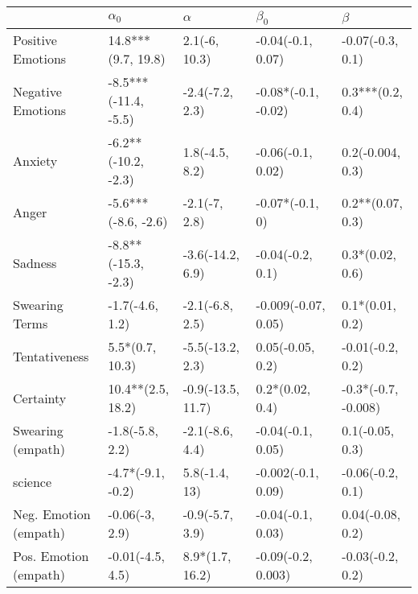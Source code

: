 \begin{tabular}{lllll}
\toprule
{} &            $\alpha_0$ &           $\alpha$ &            $\beta_0$ &              $\beta$ \\
\midrule
Positive Emotions     &    14.8***(9.7, 19.8) &      2.1(-6, 10.3) &    -0.04(-0.1, 0.07) &     -0.07(-0.3, 0.1) \\
Negative Emotions     &  -8.5***(-11.4, -5.5) &    -2.4(-7.2, 2.3) &  -0.08*(-0.1, -0.02) &     0.3***(0.2, 0.4) \\
Anxiety               &   -6.2**(-10.2, -2.3) &     1.8(-4.5, 8.2) &    -0.06(-0.1, 0.02) &     0.2(-0.004, 0.3) \\
Anger                 &   -5.6***(-8.6, -2.6) &      -2.1(-7, 2.8) &      -0.07*(-0.1, 0) &     0.2**(0.07, 0.3) \\
Sadness               &   -8.8**(-15.3, -2.3) &   -3.6(-14.2, 6.9) &     -0.04(-0.2, 0.1) &      0.3*(0.02, 0.6) \\
Swearing Terms        &       -1.7(-4.6, 1.2) &    -2.1(-6.8, 2.5) &  -0.009(-0.07, 0.05) &      0.1*(0.01, 0.2) \\
Tentativeness         &       5.5*(0.7, 10.3) &   -5.5(-13.2, 2.3) &     0.05(-0.05, 0.2) &     -0.01(-0.2, 0.2) \\
Certainty             &     10.4**(2.5, 18.2) &  -0.9(-13.5, 11.7) &      0.2*(0.02, 0.4) &  -0.3*(-0.7, -0.008) \\
Swearing (empath)     &       -1.8(-5.8, 2.2) &    -2.1(-8.6, 4.4) &    -0.04(-0.1, 0.05) &      0.1(-0.05, 0.3) \\
science               &     -4.7*(-9.1, -0.2) &      5.8(-1.4, 13) &   -0.002(-0.1, 0.09) &     -0.06(-0.2, 0.1) \\
Neg. Emotion (empath) &        -0.06(-3, 2.9) &    -0.9(-5.7, 3.9) &    -0.04(-0.1, 0.03) &     0.04(-0.08, 0.2) \\
Pos. Emotion (empath) &      -0.01(-4.5, 4.5) &    8.9*(1.7, 16.2) &   -0.09(-0.2, 0.003) &     -0.03(-0.2, 0.2) \\
\bottomrule
\end{tabular}
